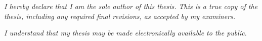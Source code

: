 \begin{center}
  \hfill
  
  \vfill
  
  \large
  \textit{I hereby declare that I am the sole author of this thesis. This is a true copy of the thesis, including any required final revisions, as accepted by my examiners.} \\ \bigskip \bigskip
  
  \textit{I understand that my thesis may be made electronically available to the public.}
  
  \vfill
\end{center}